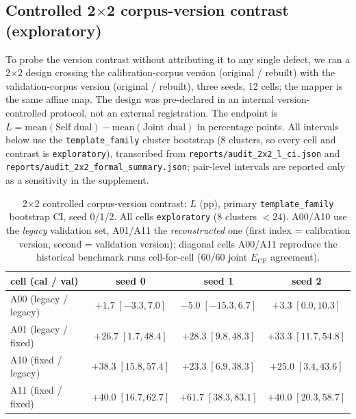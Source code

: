 \documentclass[11pt,twocolumn]{article}
\begin{document}
\subsection{Controlled 2$\times$2 corpus-version contrast (exploratory)}
\label{sec:audit2x2}

To probe the version contrast without attributing it to any single defect, we
ran a 2$\times$2 design crossing the calibration-corpus version (original /
rebuilt) with the validation-corpus version (original / rebuilt), three seeds,
12 cells; the mapper is the same affine map. The design was pre-declared in an
internal version-controlled protocol, not an external registration. The endpoint
is $L=\mathrm{mean}(\text{Self dual})-\mathrm{mean}(\text{Joint dual})$ in
percentage points. All intervals below use the \texttt{template\_family}
cluster bootstrap (8 clusters, so every cell and contrast is
\texttt{exploratory}), transcribed from
\texttt{reports/audit\_2x2\_l\_ci.json} and
\texttt{reports/audit\_2x2\_formal\_summary.json}; pair-level intervals are
reported only as a sensitivity in the supplement.

\begin{table}[t]
\centering
\caption{2$\times$2 controlled corpus-version contrast: $L$ (pp), primary
\texttt{template\_family} bootstrap CI, seed 0/1/2. All cells
\texttt{exploratory} (8 clusters $<24$). A00/A10 use the \emph{legacy}
validation set, A01/A11 the \emph{reconstructed} one (first index = calibration
version, second = validation version); diagonal cells A00/A11 reproduce the
historical benchmark runs cell-for-cell (60/60 joint $E_{\mathrm{CF}}$ agreement).}
\label{tab:audit2x2}
\begin{tabular}{lccc}
\toprule
cell (cal / val) & seed 0 & seed 1 & seed 2 \\
\midrule
A00 (legacy / legacy) & $+1.7\;[-3.3,7.0]$ & $-5.0\;[-15.3,6.7]$ & $+3.3\;[0.0,10.3]$ \\
A01 (legacy / fixed)  & $+26.7\;[1.7,48.4]$ & $+28.3\;[9.8,48.3]$ & $+33.3\;[11.7,54.8]$ \\
A10 (fixed / legacy)  & $+38.3\;[15.8,57.4]$ & $+23.3\;[6.9,38.3]$ & $+25.0\;[3.4,43.6]$ \\
A11 (fixed / fixed)   & $+40.0\;[16.7,62.7]$ & $+61.7\;[38.3,83.1]$ & $+40.0\;[20.3,58.7]$ \\
\bottomrule
\end{tabular}
\end{table}
\end{document}
